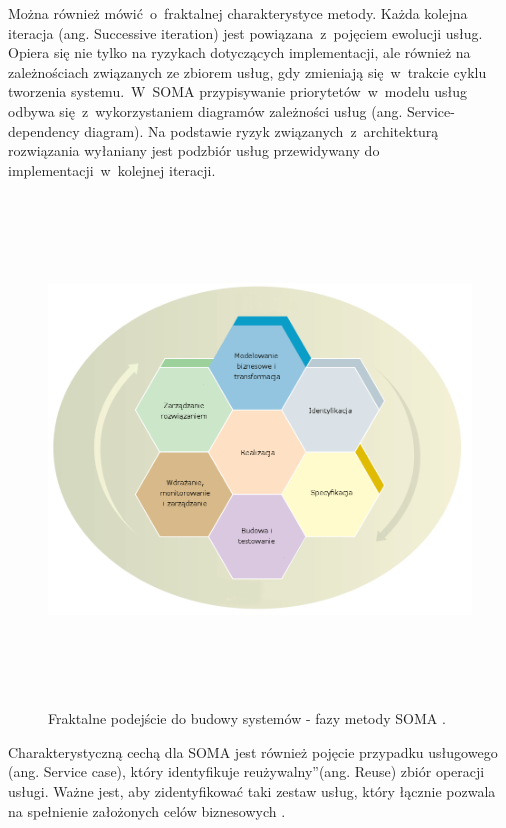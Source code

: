 Można również mówić~o~fraktalnej charakterystyce metody. Każda kolejna  iteracja (ang. Successive iteration) jest powiązana~z~pojęciem ewolucji usług. Opiera się nie tylko na ryzykach dotyczących implementacji, ale również na zależnościach związanych ze zbiorem usług, gdy zmieniają się~w~trakcie cyklu tworzenia systemu.~W~SOMA przypisywanie priorytetów~w~modelu usług odbywa się~z~wykorzystaniem diagramów zależności usług (ang. Service-dependency diagram). Na podstawie ryzyk związanych~z~architekturą rozwiązania wyłaniany jest podzbiór usług przewidywany do implementacji~w~kolejnej iteracji.

\begin{figure}[h!tbp]
\begin{centering}
\includegraphics[width=16cm, height=13.5cm]{img/soma_fractal_lifecycle.png}
\caption[Fraktalne podejście do budowy systemów - fazy metody SOMA.]{Fraktalne podejście do budowy systemów - fazy metody SOMA \cite{SOMAArsIBMJour}.}\label{soma_fractal_lifecycle}
\end{centering}
\end{figure}

Charakterystyczną cechą dla SOMA jest również pojęcie przypadku usługowego (ang. Service case), który identyfikuje \quotedblbase reużywalny\textquotedblright (ang. Reuse) zbiór operacji usługi. Ważne jest, aby zidentyfikować taki zestaw usług, który łącznie pozwala na spełnienie założonych celów biznesowych \cite{PlatIntGor}.

